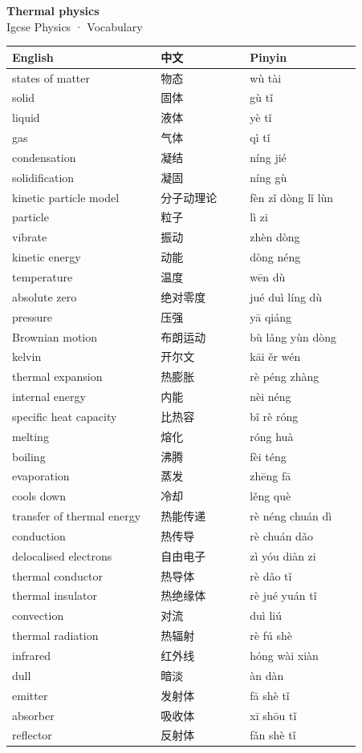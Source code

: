 \documentclass[11pt]{article}
\begin{document}
\begin{center}
  {\LARGE\bfseries Thermal physics}\\[0.35em]
  {\large Igcse Physics · Vocabulary}
\end{center}
\vspace{0.6em}

\begin{longtable}{@{}p{0.40\linewidth}p{0.24\linewidth}p{0.30\linewidth}@{}}
\toprule
\textbf{English} & \textbf{中文} & \textbf{Pinyin} \\
\midrule
\endhead
\bottomrule
\endlastfoot
states of matter & 物态 & wù tài \\
solid & 固体 & gù tǐ \\
liquid & 液体 & yè tǐ \\
gas & 气体 & qì tǐ \\
condensation & 凝结 & níng jié \\
solidification & 凝固 & níng gù \\
kinetic particle model & 分子动理论 & fèn zǐ dòng lǐ lùn \\
particle & 粒子 & lì zi \\
vibrate & 振动 & zhèn dòng \\
kinetic energy & 动能 & dòng néng \\
temperature & 温度 & wēn dù \\
absolute zero & 绝对零度 & jué duì líng dù \\
pressure & 压强 & yā qiáng \\
Brownian motion & 布朗运动 & bù lǎng yùn dòng \\
kelvin & 开尔文 & kāi ěr wén \\
thermal expansion & 热膨胀 & rè péng zhàng \\
internal energy & 内能 & nèi néng \\
specific heat capacity & 比热容 & bǐ rè róng \\
melting & 熔化 & róng huà \\
boiling & 沸腾 & fèi téng \\
evaporation & 蒸发 & zhēng fā \\
cools down & 冷却 & lěng què \\
transfer of thermal energy & 热能传递 & rè néng chuán dì \\
conduction & 热传导 & rè chuán dǎo \\
delocalised electrons & 自由电子 & zì yóu diàn zi \\
thermal conductor & 热导体 & rè dǎo tǐ \\
thermal insulator & 热绝缘体 & rè jué yuán tǐ \\
convection & 对流 & duì liú \\
thermal radiation & 热辐射 & rè fú shè \\
infrared & 红外线 & hóng wài xiàn \\
dull & 暗淡 & àn dàn \\
emitter & 发射体 & fā shè tǐ \\
absorber & 吸收体 & xī shōu tǐ \\
reflector & 反射体 & fǎn shè tǐ \\
\end{longtable}
\end{document}
